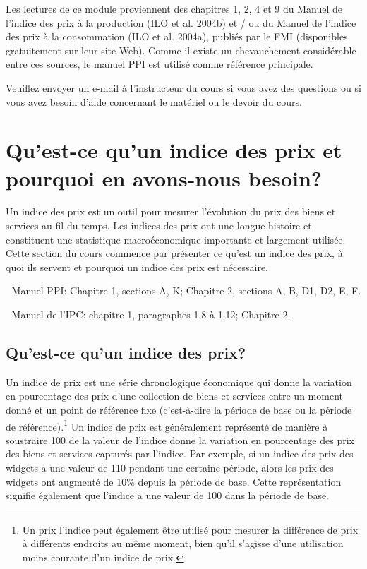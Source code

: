 \documentclass[]{article}
\begin{document}
Les lectures de ce module proviennent des chapitres 1, 2, 4 et 9 du Manuel de l'indice des prix à la production (ILO et al. 2004b) et / ou du Manuel de l'indice des prix à la consommation (ILO et al. 2004a), publiés par le FMI (disponibles gratuitement sur leur site Web). Comme il existe un chevauchement considérable entre ces sources, le manuel PPI est utilisé comme référence principale.

Veuillez envoyer un e-mail à l'instructeur du cours si vous avez des questions ou si vous avez besoin d'aide concernant le matériel ou le devoir du cours.

\hypertarget{quest-ce-quun-indice-des-prix-et-pourquoi-en-avons-nous-besoin}{%
\section{Qu'est-ce qu'un indice des prix et pourquoi en avons-nous besoin?}\label{quest-ce-quun-indice-des-prix-et-pourquoi-en-avons-nous-besoin}}

Un indice des prix est un outil pour mesurer l'évolution du prix des biens et services au fil du temps. Les indices des prix ont une longue histoire et constituent une statistique macroéconomique importante et largement utilisée. Cette section du cours commence par présenter ce qu'est un indice des prix, à quoi ils servent et pourquoi un indice des prix est nécessaire.

📖 Manuel PPI: Chapitre 1, sections A, K; Chapitre 2, sections A, B, D1, D2, E, F.

📖 Manuel de l'IPC: chapitre 1, paragraphes 1.8 à 1.12; Chapitre 2.

\hypertarget{quest-ce-quun-indice-des-prix}{%
\subsection{Qu'est-ce qu'un indice des prix?}\label{quest-ce-quun-indice-des-prix}}

Un indice de prix est une série chronologique économique qui donne la variation en pourcentage des prix d'une collection de biens et services entre un moment donné et un point de référence fixe (c'est-à-dire la période de base ou la période de référence).\footnote{Un prix l'indice peut également être utilisé pour mesurer la différence de prix à différents endroits au même moment, bien qu'il s'agisse d'une utilisation moins courante d'un indice de prix.} Un indice de prix est généralement représenté de manière à soustraire 100 de la valeur de l'indice donne la variation en pourcentage des prix des biens et services capturés par l'indice. Par exemple, si un indice des prix des widgets a une valeur de 110 pendant une certaine période, alors les prix des widgets ont augmenté de 10\% depuis la période de base. Cette représentation signifie également que l'indice a une valeur de 100 dans la période de base.
\end{document}
